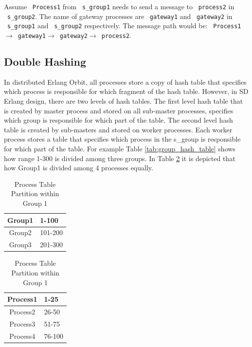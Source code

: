 \documentclass[11pt,a4paper]{article}
\begin{document}
Assume ~\texttt{Process1} from ~\texttt{s\_group1} needs to send a message to ~\texttt{process2} in ~\texttt{s\_group2}. The name of gateway processes are ~\texttt{gateway1} and ~\texttt{gateway2} in ~\texttt{s\_group1} and ~\texttt{s\_group2} respectively. The message path would be: ~\texttt{Process1}$\rightarrow$~\texttt{gateway1}$\rightarrow$~\texttt{gateway2}$\rightarrow$~\texttt{process2}. 

\subsection*{Double Hashing} In distributed Erlang Orbit, all processes store a copy of hash table that specifies which process is responsible for which fragment of the hash table. However, in SD Erlang design, there are two levels of hash tables. The first level hash table that is created by master process and stored on all sub-master processes, specifies which group is responsible for which part of the table. The second level hash table is created by sub-masters and stored on worker processes. Each worker process stores a table that specifies which process in the s\_group is responsible for which part of the table. For example Table \ref{tab:group_hash_table} shows how range 1-300 is divided among three groups. In Table \ref{tab:processes_hash_table} it is depicted that how Group1 is divided among 4 processes equally.

\begin{table}
\parbox{.45\linewidth}{
\centering

\begin{tabular}{ | c | l | }
	\hline
	Group1 & 1-100 \\ \hline
	Group2 & 101-200 \\ \hline
	Group3 & 201-300 \\ \hline
	\end{tabular}

	\caption{Group Hash Partition}
	\label{tab:group_hash_table}
}
\hfill
\parbox{.60\linewidth}{
\centering

\begin{tabular}{ | c | l | }
	\hline
	Process1 & 1-25 \\ \hline
	Process2 & 26-50 \\ \hline
	Process3 & 51-75 \\ \hline
	Process4 & 76-100 \\ \hline
	\end{tabular}

	\caption{Process Table Partition within Group 1}
	\label{tab:processes_hash_table}
}
\end{table}
\end{document}
